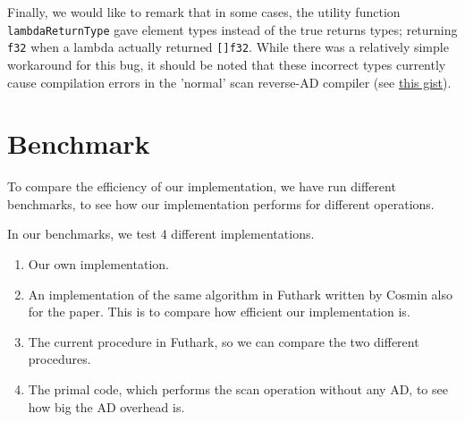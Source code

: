 \documentclass{article}
\begin{document}
Finally, we would like to remark that in some cases, the utility function \lstinline{lambdaReturnType} gave element types instead of the true returns types; returning \lstinline{f32} when a lambda actually returned \lstinline{[]f32}. While there was a relatively simple workaround for this bug, it should be noted that these incorrect types currently cause compilation errors in the 'normal' scan reverse-AD compiler (see \href{https://gist.github.com/p-adema/c8fc4fd5823baca18d90385370aeda5d}{this gist}).

\newpage
\section{Benchmark}
To compare the efficiency of our implementation,
we have run different benchmarks,
to see how our implementation performs for different operations.

In our benchmarks, we test 4 different implementations.
\begin{enumerate}

	\item Our own implementation.
	\item An implementation of the same algorithm in Futhark written by Cosmin
	      also for the \cite{Futhark} paper.
	      This is to compare how efficient our implementation is.
	\item The current procedure in Futhark, so we can compare the two
	      different procedures.
	\item The primal code, which performs the scan operation without any AD,
	      to see how big the AD overhead is.

\end{enumerate}
\end{document}
